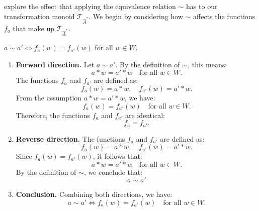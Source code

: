  explore the effect that applying the equivalence relation $\sim$ has to our transformation monoid $\mathcal{T}_{\hat{A}^{*}}$.
We begin by considering how $\sim$ affects the functions $f_{a}$ that make up $\mathcal{T}_{\hat{A}^{\ast}}$.

\begin{propositionE}
\label{prp:equivalence_equivalence_on_functions}
    $a \sim a' \iff f_{a}(w) = f_{a'}(w)$ for all $w \in W$.
\end{propositionE}
\begin{proofE}
\begin{enumerate}
    \item \textbf{Forward direction.}
    Let $a \sim a'$. By the definition of $\sim$, this means:
    \begin{equation}
        a \ast w = a' \ast w \quad \text{for all } w \in W.
    \end{equation}
    The functions $f_{a}$ and $f_{a'}$ are defined as:
    \begin{equation}
        f_{a}(w) = a \ast w, \quad f_{a'}(w) = a' \ast w.
    \end{equation}
    From the assumption $a \ast w = a' \ast w$, we have:
    \begin{equation}
        f_{a}(w) = f_{a'}(w) \quad \text{for all } w \in W.
    \end{equation}
    Therefore, the functions $f_{a}$ and $f_{a'}$ are identical:
    \begin{equation}
        f_{a} = f_{a'}.
    \end{equation}

    \item \textbf{Reverse direction.}
    The functions $f_{a}$ and $f_{a'}$ are defined as:
    \begin{equation}
        f_{a}(w) = a \ast w, \quad f_{a'}(w) = a' \ast w.
    \end{equation}
    Since $f_{a}(w) = f_{a'}(w)$, it follows that:
    \begin{equation}
        a \ast w = a' \ast w \quad \text{for all } w \in W.
    \end{equation}
    By the definition of $\sim$, we conclude that:
    \begin{equation}
        a \sim a'
    \end{equation}

    \item \textbf{Conclusion.}
    Combining both directions, we have:
    \begin{equation}
        a \sim a' \iff f_{a}(w) = f_{a'}(w) \quad \text{for all } w \in W.
    \end{equation}
\end{enumerate}
\end{proofE}

